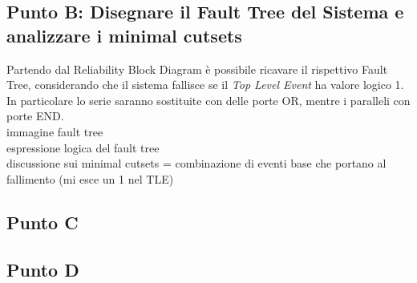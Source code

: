 \subsection{Punto B: Disegnare il Fault Tree del Sistema e analizzare i minimal cutsets}
Partendo dal Reliability Block Diagram è possibile ricavare il rispettivo Fault Tree, considerando che il sistema fallisce se il \textit{Top Level Event} ha valore logico 1.
\\In particolare lo serie saranno sostituite con delle porte OR, mentre i paralleli con porte END. 
\\immagine fault tree
\\espressione logica del fault tree 
\\discussione sui minimal cutsets = combinazione di eventi base che portano al fallimento (mi esce un 1 nel TLE)
\subsection{Punto C}
\subsection{Punto D}
